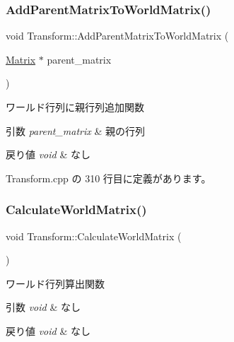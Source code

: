 \subsubsection{\texorpdfstring{Add\+Parent\+Matrix\+To\+World\+Matrix()}{AddParentMatrixToWorldMatrix()}}
{\footnotesize\ttfamily void Transform\+::\+Add\+Parent\+Matrix\+To\+World\+Matrix (\begin{DoxyParamCaption}\item[{\mbox{\hyperlink{class_matrix}{Matrix}} $\ast$}]{parent\+\_\+matrix }\end{DoxyParamCaption})}



ワールド行列に親行列追加関数 


\begin{DoxyParams}{引数}
{\em parent\+\_\+matrix} & 親の行列 \\
\hline
\end{DoxyParams}

\begin{DoxyRetVals}{戻り値}
{\em void} & なし \\
\hline
\end{DoxyRetVals}


 Transform.\+cpp の 310 行目に定義があります。

\mbox{\label{class_transform_a2f5c4e0e8a7aae115f37a2cdd0a745d7}} 
\subsubsection{\texorpdfstring{Calculate\+World\+Matrix()}{CalculateWorldMatrix()}}
{\footnotesize\ttfamily void Transform\+::\+Calculate\+World\+Matrix (\begin{DoxyParamCaption}{ }\end{DoxyParamCaption})\hspace{0.3cm}{\ttfamily [private]}}



ワールド行列算出関数 


\begin{DoxyParams}{引数}
{\em void} & なし \\
\hline
\end{DoxyParams}

\begin{DoxyRetVals}{戻り値}
{\em void} & なし \\
\hline
\end{DoxyRetVals}


